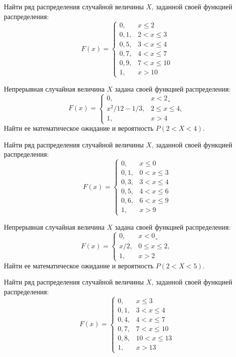 

\z Найти ряд распределения случайной величины $X$, заданной своей функцией распределения: $$ F(x) = \begin{cases}0, & x \leqslant 2 \\ 0{,}1, & 2 < x \leqslant 3 \\ 0{,}5, & 3 < x \leqslant 4 \\ 0{,}7, & 4 < x \leqslant 7 \\ 0{,}9, & 7 < x \leqslant 10 \\ 1, & x > 10 \end{cases} $$


\vfill

\z Непрерывная случайная величина $X$ задана своей функцией распределения: $$ F(x) = \begin{cases}0, & x < 2¸\\ x^2/12-1/3, & 2 \leqslant x \leqslant 4, \\ 1, & x > 4 \end{cases} $$ Найти ее математическое ожидание и вероятность $P(2 < X < 4)$.
 

\vfill

\newpage\setcounter{zad}{0}

\z Найти ряд распределения случайной величины $X$, заданной своей функцией распределения: $$ F(x) = \begin{cases}0, & x \leqslant 0 \\ 0{,}1, & 0 < x \leqslant 3 \\ 0{,}3, & 3 < x \leqslant 4 \\ 0{,}5, & 4 < x \leqslant 6 \\ 0{,}6, & 6 < x \leqslant 9 \\ 1, & x > 9 \end{cases} $$


\vfill

\z Непрерывная случайная величина $X$ задана своей функцией распределения: $$ F(x) = \begin{cases}0, & x < 0¸\\ x/2, & 0 \leqslant x \leqslant 2, \\ 1, & x > 2 \end{cases} $$ Найти ее математическое ожидание и вероятность $P(2 < X < 5)$.
 

\vfill

\newpage\setcounter{zad}{0}

\z Найти ряд распределения случайной величины $X$, заданной своей функцией распределения: $$ F(x) = \begin{cases}0, & x \leqslant 3 \\ 0{,}1, & 3 < x \leqslant 4 \\ 0{,}4, & 4 < x \leqslant 7 \\ 0{,}7, & 7 < x \leqslant 10 \\ 0{,}8, & 10 < x \leqslant 13 \\ 1, & x > 13 \end{cases} $$


